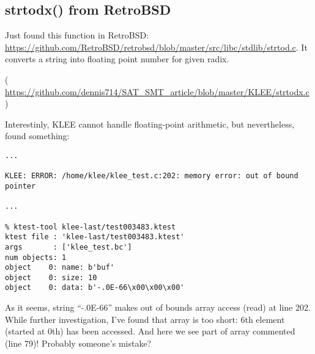 \subsection{strtodx() from RetroBSD}

Just found this function in RetroBSD:
\url{https://github.com/RetroBSD/retrobsd/blob/master/src/libc/stdlib/strtod.c}.
It converts a string into floating point number for given radix.


( \url{https://github.com/dennis714/SAT_SMT_article/blob/master/KLEE/strtodx.c} )

Interestinly, KLEE cannot handle floating-point arithmetic, but nevertheless, found something:

\begin{lstlisting}
...

KLEE: ERROR: /home/klee/klee_test.c:202: memory error: out of bound pointer

...

% ktest-tool klee-last/test003483.ktest
ktest file : 'klee-last/test003483.ktest'
args       : ['klee_test.bc']
num objects: 1
object    0: name: b'buf'
object    0: size: 10
object    0: data: b'-.0E-66\x00\x00\x00'
\end{lstlisting}

As it seems, string ``-.0E-66'' makes out of bounds array access (read) at line 202.
While further investigation, I've found that  array is too short:
6th element (started at 0th) has been accessed.
And here we see part of array commented (line 79)!
Probably someone's mistake?

